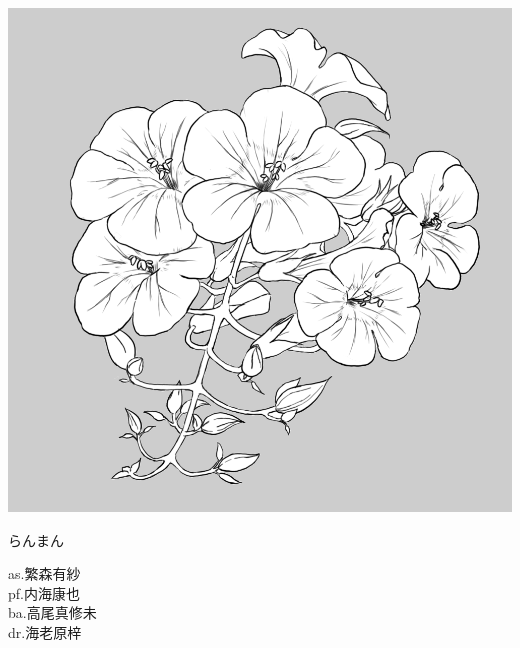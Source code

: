 \documentclass[a4paper]{article}
\begin{document}
\begin{minipage}{0.25\textheight}
    \flushleft
    \includegraphics[width=0.25\textheight]{./FULLHOUSE/resources/14.png}
\end{minipage}
\begin{minipage}{\textwidth - 0.25\textheight}
    \flushleft
    \Huge \vspace{1em}らんまん\vspace{1em}\normalsize \\
    \begin{minipage}{15em}
        \flushleft
        \Large
        as.繁森有紗\\ pf.内海康也\\ ba.高尾真修未\\ dr.海老原梓
    \end{minipage}
    \begin{minipage}{\textwidth - 18em}
        \flushleft
        \large
    \end{minipage}
\end{minipage}
\end{document}
